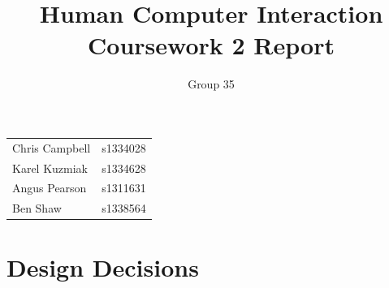 \documentclass[a4paper, notoc]{tufte-handout}
\title{Human Computer Interaction\\ Coursework 2 Report}
\author{Group 35}
\begin{document}
\maketitle %
\vspace{1em}
\noindent
\begin{tabular}{l r}
  Chris Campbell & s1334028\\
  Karel Kuzmiak  & s1334628\\
  Angus Pearson  & s1311631\\
  Ben Shaw       & s1338564\\
\end{tabular}


\section{Design Decisions}\label{design-decisions}
\end{document}
